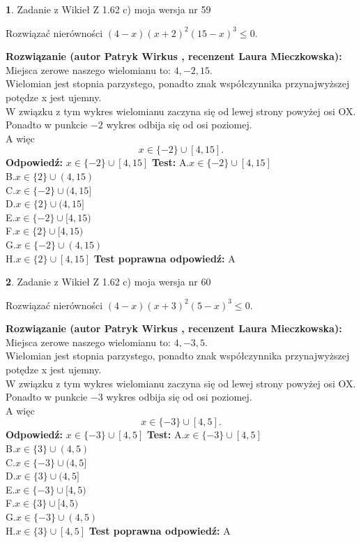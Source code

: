 \documentclass[12pt, a4paper]{article}
\theoremstyle{definition} %
\newtheorem{zad}{}
\newcommand{\zadStart}[1]{\begin{zad}#1\newline}
\newcommand{\zadStop}{\end{zad}}
\newcommand{\rozwStart}[2]{\noindent \textbf{Rozwiązanie (autor #1 , recenzent #2): }\newline}
\newcommand{\rozwStop}{\newline}
\newcommand{\odpStart}{\noindent \textbf{Odpowiedź:}\newline}
\newcommand{\odpStop}{\newline}
\newcommand{\testStart}{\noindent \textbf{Test:}\newline}
\newcommand{\testStop}{\newline}
\newcommand{\kluczStart}{\noindent \textbf{Test poprawna odpowiedź:}\newline}
\newcommand{\kluczStop}{\newline}
\begin{document}
\zadStart{Zadanie z Wikieł Z 1.62 c) moja wersja nr 59}

Rozwiązać nierówności $(4-x)(x+2)^{2}(15-x)^{3}\le0$.
\zadStop
\rozwStart{Patryk Wirkus}{Laura Mieczkowska}
Miejsca zerowe naszego wielomianu to: $4, -2, 15$.\\
Wielomian jest stopnia parzystego, ponadto znak współczynnika przy\linebreak najwyższej potędze x jest ujemny.\\ W związku z tym wykres wielomianu zaczyna się od lewej strony powyżej osi OX.\\
Ponadto w punkcie $-2$ wykres odbija się od osi poziomej.\\
A więc $$x \in \{-2\} \cup [4,15].$$
\rozwStop
\odpStart
$x \in \{-2\} \cup [4,15]$
\odpStop
\testStart
A.$x \in \{-2\} \cup [4,15]$\\
B.$x \in \{2\} \cup (4,15)$\\
C.$x \in \{-2\} \cup (4,15]$\\
D.$x \in \{2\} \cup (4,15]$\\
E.$x \in \{-2\} \cup [4,15)$\\
F.$x \in \{2\} \cup [4,15)$\\
G.$x \in \{-2\} \cup (4,15)$\\
H.$x \in \{2\} \cup [4,15]$
\testStop
\kluczStart
A
\kluczStop



\zadStart{Zadanie z Wikieł Z 1.62 c) moja wersja nr 60}

Rozwiązać nierówności $(4-x)(x+3)^{2}(5-x)^{3}\le0$.
\zadStop
\rozwStart{Patryk Wirkus}{Laura Mieczkowska}
Miejsca zerowe naszego wielomianu to: $4, -3, 5$.\\
Wielomian jest stopnia parzystego, ponadto znak współczynnika przy\linebreak najwyższej potędze x jest ujemny.\\ W związku z tym wykres wielomianu zaczyna się od lewej strony powyżej osi OX.\\
Ponadto w punkcie $-3$ wykres odbija się od osi poziomej.\\
A więc $$x \in \{-3\} \cup [4,5].$$
\rozwStop
\odpStart
$x \in \{-3\} \cup [4,5]$
\odpStop
\testStart
A.$x \in \{-3\} \cup [4,5]$\\
B.$x \in \{3\} \cup (4,5)$\\
C.$x \in \{-3\} \cup (4,5]$\\
D.$x \in \{3\} \cup (4,5]$\\
E.$x \in \{-3\} \cup [4,5)$\\
F.$x \in \{3\} \cup [4,5)$\\
G.$x \in \{-3\} \cup (4,5)$\\
H.$x \in \{3\} \cup [4,5]$
\testStop
\kluczStart
A
\kluczStop
\end{document}
